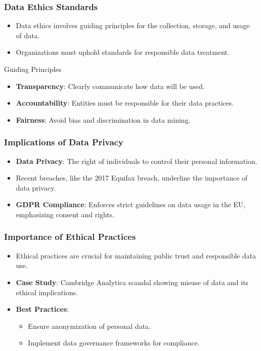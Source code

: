 \documentclass[aspectratio=169]{beamer}
\begin{document}
\begin{frame}[fragile]
    \frametitle{Data Ethics Standards}
    \begin{itemize}
        \item Data ethics involves guiding principles for the collection, storage, and usage of data.
        \item Organizations must uphold standards for responsible data treatment.
    \end{itemize}
    
    \begin{block}{Guiding Principles}
        \begin{itemize}
            \item \textbf{Transparency}: Clearly communicate how data will be used.
            \item \textbf{Accountability}: Entities must be responsible for their data practices.
            \item \textbf{Fairness}: Avoid bias and discrimination in data mining.
        \end{itemize}
    \end{block}
\end{frame}

\begin{frame}[fragile]
    \frametitle{Implications of Data Privacy}
    \begin{itemize}
        \item \textbf{Data Privacy}: The right of individuals to control their personal information.
        \item Recent breaches, like the 2017 Equifax breach, underline the importance of data privacy.
        \item \textbf{GDPR Compliance}: Enforces strict guidelines on data usage in the EU, emphasizing consent and rights.
    \end{itemize}
\end{frame}

\begin{frame}[fragile]
    \frametitle{Importance of Ethical Practices}
    \begin{itemize}
        \item Ethical practices are crucial for maintaining public trust and responsible data use.
        \item \textbf{Case Study}: Cambridge Analytica scandal showing misuse of data and its ethical implications.
        \item \textbf{Best Practices}:
        \begin{itemize}
            \item Ensure anonymization of personal data.
            \item Implement data governance frameworks for compliance.
        \end{itemize}
    \end{itemize}
\end{frame}
\end{document}
